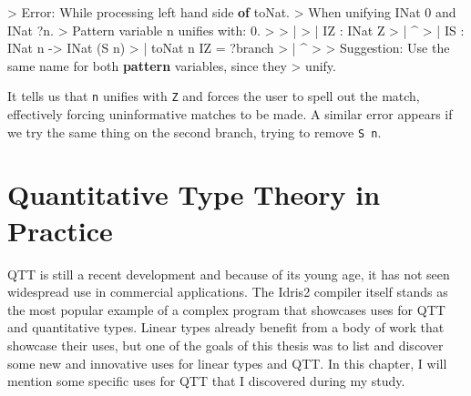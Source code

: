 \documentclass[
]{article}
\newenvironment{Shaded}{}{}
\newcommand{\DataTypeTok}[1]{\textcolor[rgb]{0.56,0.13,0.00}{#1}}
\newcommand{\DecValTok}[1]{\textcolor[rgb]{0.25,0.63,0.44}{#1}}
\newcommand{\FunctionTok}[1]{\textcolor[rgb]{0.02,0.16,0.49}{#1}}
\newcommand{\KeywordTok}[1]{\textcolor[rgb]{0.00,0.44,0.13}{\textbf{#1}}}
\newcommand{\NormalTok}[1]{#1}
\newcommand{\OperatorTok}[1]{\textcolor[rgb]{0.40,0.40,0.40}{#1}}
\newcommand{\OtherTok}[1]{\textcolor[rgb]{0.00,0.44,0.13}{#1}}
\begin{document}
\begin{Shaded}
\begin{Highlighting}[]
\OperatorTok{\textgreater{}} \DataTypeTok{Error}\OperatorTok{:} \DataTypeTok{While}\NormalTok{ processing left hand side }\KeywordTok{of}\NormalTok{ toNat}\OperatorTok{.} 
\OperatorTok{\textgreater{}}   \DataTypeTok{When}\NormalTok{ unifying }\DataTypeTok{INat} \DecValTok{0} \FunctionTok{and} \DataTypeTok{INat} \OperatorTok{?}\NormalTok{n}\OperatorTok{.}
\OperatorTok{\textgreater{}} \DataTypeTok{Pattern}\NormalTok{ variable n unifies with}\OperatorTok{:} \DecValTok{0}\OperatorTok{.}
\OperatorTok{\textgreater{}} 
\OperatorTok{\textgreater{}}     \OperatorTok{|}
\OperatorTok{\textgreater{}}     \OperatorTok{|}   \DataTypeTok{IZ} \OperatorTok{:} \DataTypeTok{INat} \DataTypeTok{Z}
\OperatorTok{\textgreater{}}     \OperatorTok{|}             \OperatorTok{\^{}}
\OperatorTok{\textgreater{}}     \OperatorTok{|}   \DataTypeTok{IS} \OperatorTok{:} \DataTypeTok{INat}\NormalTok{ n }\OtherTok{{-}\textgreater{}} \DataTypeTok{INat}\NormalTok{ (}\DataTypeTok{S}\NormalTok{ n)}
\OperatorTok{\textgreater{}}     \OperatorTok{|}\NormalTok{  toNat n }\DataTypeTok{IZ} \OtherTok{=} \OperatorTok{?}\NormalTok{branch}
\OperatorTok{\textgreater{}}     \OperatorTok{|}        \OperatorTok{\^{}}
\OperatorTok{\textgreater{}} 
\OperatorTok{\textgreater{}} \DataTypeTok{Suggestion}\OperatorTok{:} \DataTypeTok{Use}\NormalTok{ the same name for both }\KeywordTok{pattern}\NormalTok{ variables, since they }
\OperatorTok{\textgreater{}}\NormalTok{   unify}\OperatorTok{.}
\end{Highlighting}
\end{Shaded}

It tells us that \texttt{n} unifies with \texttt{Z} and forces the user
to spell out the match, effectively forcing uninformative matches to be
made. A similar error appears if we try the same thing on the second
branch, trying to remove \texttt{S\ n}.

\newpage

\hypertarget{quantitative-type-theory-in-practice}{%
\section{Quantitative Type Theory in
Practice}\label{quantitative-type-theory-in-practice}}

\label {sec:qtt-practice}

QTT is still a recent development and because of its young age, it has
not seen widespread use in commercial applications. The Idris2 compiler
itself stands as the most popular example of a complex program that
showcases uses for QTT and quantitative types. Linear types already
benefit from a body of work that showcase their
uses\cite{linear_diff}\cite{linear_types_update}\cite{linear_types_session}\cite{linear_types_subst}\cite{actor_channels}\cite{linear_race}\cite{linear_use}\cite{once_upon_a_type}\cite{deforestation},
but one of the goals of this thesis was to list and discover some new
and innovative uses for linear types and QTT. In this chapter, I will
mention some specific uses for QTT that I discovered during my study.
\end{document}
